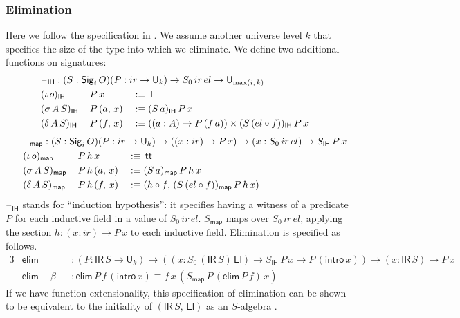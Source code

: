 \documentclass[acmsmall,screen,review,anonymous]{acmart}
\newcommand{\msf}[1]{{\mathsf{#1}}}
\newcommand{\U}{\msf{U}}
\newcommand{\El}{\msf{El}}
\newcommand{\Sig}{\msf{Sig}}
\newcommand{\ttt}{\msf{tt}}
\newcommand{\blank}{{\mathord{\hspace{1pt}\text{--}\hspace{1pt}}}}
\newcommand{\ir}{{ir}}
\newcommand{\el}{{el}}
\newcommand{\IR}{\msf{IR}}
\newcommand{\intro}{\msf{intro}}
\newcommand{\IH}{\msf{IH}}
\newcommand{\map}{\msf{map}}
\newcommand{\elim}{\msf{elim}}
\begin{document}
\subsubsection{Elimination}\label{sec:ir-elimination}

Here we follow the specification in \cite{TODO}. We assume another universe level $k$ that specifies
the size of the type into which we eliminate. We define two additional functions on signatures:
\begin{alignat*}{3}
  &\rlap{$\blank_\IH : (S : \Sig_i\,O)(P : \ir \to \U_k) \to S_0\,\ir\,\el \to \U_{\max(i,\,k)}$} \\
  &(\iota\,o)_\IH    \,&&P\,x       &&:\equiv \top \\
  &(\sigma\,A\,S)_\IH\,&&P\,(a,\,x) &&:\equiv (S\,a)_\IH\,P\,x \\
  &(\delta\,A\,S)_\IH\,&&P\,(f,\,x) &&:\equiv ((a : A) \to P\,(f\,a)) \times (S\,(\el \circ f))_\IH\,P\,x
\end{alignat*}
\begin{alignat*}{3}
  &\hspace{-7em}\rlap{$\blank_\map : (S : \Sig_i\,O)(P : \ir \to \U_k) \to ((x : \ir) \to P\,x) \to (x : S_0\,\ir\,\el) \to S_\IH\,P\,x$} \\
  &\hspace{-7em}(\iota\,o)_\map    \,&&P\,h\,x       &&:\equiv\,\ttt \\
  &\hspace{-7em}(\sigma\,A\,S)_\map\,&&P\,h\,(a,\,x) &&:\equiv (S\,a)_\map\,P\,h\,x \\
  &\hspace{-7em}(\delta\,A\,S)_\map\,&&P\,h\,(f,\,x) &&:\equiv (h \circ f,\,(S\,(\el \circ f))_\map\,P\,h\,x)
\end{alignat*}
$\blank_\IH$ stands for ``induction hypothesis'': it specifies having a witness of a predicate $P$ for
each inductive field in a value of $S_0\,\ir\,\el$. $S_\map$ maps over $S_0\,\ir\,\el$, applying the
section $h : (x : \ir) \to P\,x$ to each inductive field. Elimination is specified as follows.
\begin{alignat*}{3}
  &\elim           &&: (P : \IR\,S \to \U_k) \to ((x : S_0\,(\IR\,S)\,\El) \to S_\IH\,P\,x \to P\,(\intro\,x)) \to (x : \IR\,S) \to P\,x \\
  &\elim\!-\!\!\beta &&: \elim\,P\,f\,(\intro\,x) \equiv f\,x\,(S_\map\,P\,(\elim\,P\,f)\,x)
\end{alignat*}
If we have function extensionality, this specification of elimination can be shown to be equivalent
to the initiality of $(\IR\,S,\,\El)$ as an $S$-algebra \cite{TODO}.
\end{document}
